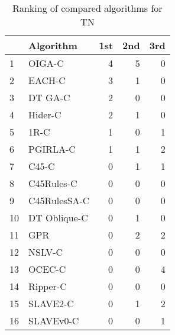 \begin{table}
\footnotesize
\caption{Ranking of compared algorithms for TN}
\label{tab:places TN}
\begin{tabular}{llrrr}
\hline
 & Algorithm & 1st & 2nd & 3rd \\
\hline
1 & OIGA-C & 4 & 5 & 0 \\
2 & EACH-C & 3 & 1 & 0 \\
3 & DT GA-C & 2 & 0 & 0 \\
4 & Hider-C & 2 & 1 & 0 \\
5 & 1R-C & 1 & 0 & 1 \\
6 & PGIRLA-C & 1 & 1 & 2 \\
7 & C45-C & 0 & 1 & 1 \\
8 & C45Rules-C & 0 & 0 & 0 \\
9 & C45RulesSA-C & 0 & 0 & 0 \\
10 & DT Oblique-C & 0 & 1 & 0 \\
11 & GPR & 0 & 2 & 2 \\
12 & NSLV-C & 0 & 0 & 0 \\
13 & OCEC-C & 0 & 0 & 4 \\
14 & Ripper-C & 0 & 0 & 0 \\
15 & SLAVE2-C & 0 & 1 & 2 \\
16 & SLAVEv0-C & 0 & 0 & 1 \\
\hline
\end{tabular}
\end{table}
